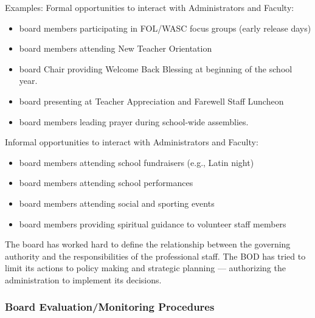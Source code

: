 \begin{findings}
Examples:
Formal opportunities to interact with Administrators and Faculty:
\begin{itemize}
\item board members participating in FOL/WASC focus groups (early release days)
\item board members attending New Teacher Orientation
\item board Chair providing Welcome Back Blessing at beginning of the school year. 
\item board presenting at Teacher Appreciation and Farewell Staff Luncheon 
\item board members leading prayer during school-wide assemblies.
\end{itemize}

Informal opportunities to interact with Administrators and Faculty: 
\begin{itemize}
\item board members attending school fundraisers (e.g., Latin night)
\item board members attending school performances
\item board members attending social and sporting events
\item board members providing spiritual guidance to volunteer staff members
\end{itemize}


The board has worked hard to define the relationship between the governing authority and the responsibilities of the professional staff. The BOD has tried to limit its actions to policy making and strategic planning — authorizing the administration to implement its decisions.
\end{findings}

\subsubsection{Board Evaluation/Monitoring Procedures}



